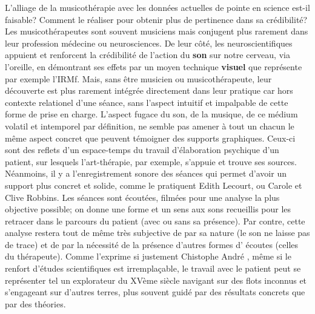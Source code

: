 L'alliage de la musicothérapie avec les données actuelles de pointe en
science est-il faisable? Comment le réaliser pour obtenir plus de pertinence
dans sa crédibilité?
Les musicothérapeutes sont souvent musiciens mais conjugent plus
rarement dans leur profession
médecine ou neurosciences. De leur côté, les neuroscientifiques appuient
et renforcent la crédibilité de l'action du \textbf{son} sur notre cerveau, via
l'oreille, en démontrant ses effets par un moyen technique
\textbf{visuel} que représente par exemple l'IRMf. Mais, sans être musicien ou
musicothérapeute, leur découverte est plus rarement intégrée
directement dans leur pratique car hors contexte relationel d'une
séance, sans l'aspect intuitif et impalpable de cette forme de prise
en charge.
L'aspect fugace du son, de la musique, de ce médium volatil et
intemporel par
définition, ne semble pas amener à tout un chacun le
même aspect concret que peuvent témoigner des supports
graphiques. Ceux-ci sont des
reflets d'un espace-temps du travail d'élaboration
psychique d'un patient, sur lesquels l'art-thérapie, par exemple, s'appuie et
trouve
ses sources.
Néanmoins, il y a l'enregistrement sonore des séances qui
permet d'avoir un support plus concret et solide, comme le pratiquent Edith
Lecourt, ou Carole et Clive
Robbins.  \autocite {lecourt_les_2017}
Les séances sont écoutées, filmées pour une
analyse la plus objective possible; on donne
une forme et un sens aux sons recueillis pour les retracer dans le
parcours du patient (avec ou sans sa présence). Par contre, cette analyse  restera
tout de même très subjective de par sa nature (le son ne laisse pas
de trace) et de par la nécessité de la présence d'autres formes d'
écoutes (celles du thérapeute).
Comme l'exprime si justement Chistophe André \autocite[154]{van_eersel_cerveau},
même si le renfort d'études
scientifiques est irremplaçable, le travail avec le patient peut se représenter
tel un
explorateur du XVème siècle navigant sur des flots inconnus et
s'engageant sur d'autres terres, plus souvent guidé par des résultats
concrets que par des théories.
